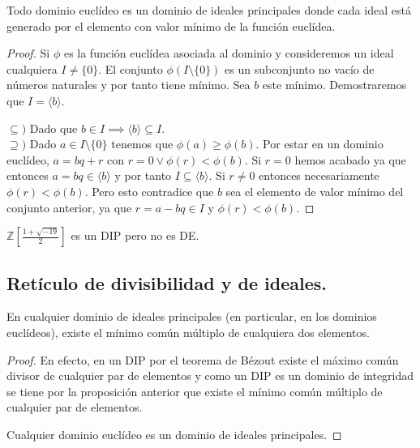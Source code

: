 \begin{proposition}
Todo dominio euclídeo es un dominio de ideales principales donde cada ideal está generado por el elemento con valor mínimo de la función euclídea.  
\end{proposition}
\begin{proof}
Si $\phi$ es la función euclídea asociada al dominio y consideremos un ideal cualquiera $I \neq \{0\}$. El conjunto $\phi(I \setminus \{0\})$ es un subconjunto no vacío de números naturales y por tanto tiene mínimo. Sea $b$ este mínimo. Demostraremos que $I = \langle b \rangle$. 

$\subseteq)$ Dado que $b \in I \implies \langle b \rangle \subseteq I$. \\
$\supseteq)$ Dado $a \in I \setminus \{0\}$ tenemos que $\phi(a) \ge \phi(b)$. Por estar en un dominio euclídeo, $a = bq + r$ con $r = 0 \lor \phi(r) < \phi(b)$. Si $r = 0$ hemos acabado ya que entonces $a = bq \in \langle b \rangle$ y por tanto $I \subseteq \langle b \rangle$. Si $r \neq 0$ entonces necesariamente $\phi(r) < \phi(b)$. Pero esto contradice que $b$ sea el elemento de valor mínimo del conjunto anterior, ya que $r = a - bq \in I$ y $\phi(r) < \phi(b)$. 
\end{proof}

\begin{example}
$\mathbb{Z}[\frac{1+\sqrt{-19}}{2}]$ es un DIP pero no es DE.
\end{example}

\subsection{Retículo de divisibilidad y de ideales.}

\begin{corollary}
En cualquier dominio de ideales principales (en particular, en los dominios euclídeos), existe el mínimo común múltiplo de cualquiera dos elementos.
\end{corollary}
\begin{proof}
En efecto, en un DIP por el teorema de Bézout existe el máximo común divisor de cualquier par de elementos y como un DIP es un dominio de integridad se tiene por la proposición anterior que existe el mínimo común múltiplo de cualquier par de elementos. 

Cualquier dominio euclídeo es un dominio de ideales principales. 
\end{proof}

